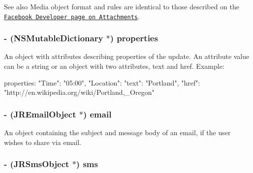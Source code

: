 \begin{DoxySeeAlso}{See also}
Media object format and rules are identical to those described on the \href{http://developers.facebook.com/docs/guides/attachments}{\tt Facebook Developer page on Attachments}. 
\end{DoxySeeAlso}
\hypertarget{interface_j_r_activity_object_a1acf84854d275510685a1f2066061c4e}{
\subsubsection[{properties}]{\setlength{\rightskip}{0pt plus 5cm}-\/ (NSMutableDictionary $\ast$) properties}}
\label{interface_j_r_activity_object_a1acf84854d275510685a1f2066061c4e}
An object with attributes describing properties of the update. An attribute value can be a string or an object with two attributes, text and href. Example: 
\begin{DoxyCode}
   properties: 
   {
       "Time": "05:00",
       "Location": 
       {
           "text": "Portland",
           "href": "http://en.wikipedia.org/wiki/Portland,_Oregon"
       }
   }
\end{DoxyCode}
 \hypertarget{interface_j_r_activity_object_aa26818070a5987c70ef14700d6f6c72c}{
\subsubsection[{email}]{\setlength{\rightskip}{0pt plus 5cm}-\/ ({\bf JREmailObject} $\ast$) email}}
\label{interface_j_r_activity_object_aa26818070a5987c70ef14700d6f6c72c}
\label{interface_j_r_activity_object_activityEmail}
\hypertarget{interface_j_r_activity_object_activityEmail}{}


An object containing the subject and message body of an email, if the user wishes to share via email. \hypertarget{interface_j_r_activity_object_a7719b59135bd02dbd03d4b35b17cb0a0}{
\subsubsection[{sms}]{\setlength{\rightskip}{0pt plus 5cm}-\/ ({\bf JRSmsObject} $\ast$) sms}}
\label{interface_j_r_activity_object_a7719b59135bd02dbd03d4b35b17cb0a0}
\label{interface_j_r_activity_object_activitySms}
\hypertarget{interface_j_r_activity_object_activitySms}{}


